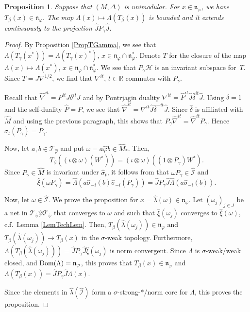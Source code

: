 \documentclass[pdftex]{sigma}
\numberwithin{equation}{section}
\newtheorem{prop}[thm]{Proposition}
\theoremstyle{definition}
\newcommand{\cHil}{\mathcal{H}}
\newcommand{\nphi}{\mathfrak{n}_\varphi}
\newcommand{\Dom}{\text{\rm Dom}}
\begin{document}
\begin{prop}\label{PropTBeta}
Suppose that $(M, \Delta)$ is unimodular. For $x \in \nphi$, we have $T_\beta(x) \in \nphi$. The map $\Lambda(x) \mapsto \Lambda(T_\beta(x))$ is bounded and it extends continuously to the projection $\hat{J} P_\gamma \hat{J}$.
\end{prop}
\begin{proof}
By Proposition \ref{PropTGamma}, we see that $\Lambda(T_\gamma(x^\ast)) = \Lambda(T_\gamma(x)^\ast)$, $x \in \nphi \cap \nphi^\ast$. Denote $T$ for the closure of the map $\Lambda(x) \mapsto \Lambda(x^\ast)$, $x \in \nphi \cap \nphi^\ast$. We see that $P_\gamma \cHil$ is an invariant subspace for~$T$. Since $T = J \nabla^{1/2}$, we f\/ind that $\nabla^{it}$, $t \in \mathbb{R}$ commutes with $P_\gamma$.

Recall \cite[Lemma 8.8, Proposition 8.9]{KusVae} that $\hat{\nabla}^{it} =  P^{it} J \delta^{it} J$ and by Pontrjagin duality  $\nabla^{it} =  \hat{P}^{it} \hat{J} \hat{\delta}^{it} \hat{J}$. Using $\delta = 1$ and the self-duality $\hat{P} = P$, we see that $\hat{\nabla}^{it} =  \nabla^{it} \hat{J} \hat{\delta}^{-it} \hat{J}$. Since $\hat{\delta}$ is af\/f\/iliated with $\hat{M}$ and using the previous paragraph, this shows that $P_\gamma \hat{\nabla}^{it} = \hat{\nabla}^{it} P_\gamma$. Hence $\hat{\sigma}_t (P_\gamma) = P_\gamma$.

Now, let $a, b \in \mathcal{T}_{\hat{\varphi}}$ and put $\omega = a\hat{ \varphi} b \in \hat{M}_\ast$. Then,
\[
T_\beta\left( (\iota \otimes \omega)(W^\ast) \right) = (\iota \otimes \omega)\left( (1 \otimes P_\gamma) W^\ast \right).
\]
Since $P_\gamma \in \hat{M}$ is invariant under $\hat{\sigma}_t$, it follows from \cite[Chapter VIII, Lemma 2.4 (ii) and Lemma 2.5]{TakII} that $\omega P_\gamma \in \hat{\mathcal{I}}$ and
\[
\hat{\xi}(\omega P_\gamma ) = \hat{\Lambda}(a \hat{\sigma}_{-i}(b) \hat{\sigma}_{-i}(P_\gamma))  = \hat{J} P_\gamma \hat{J} \hat{\Lambda}(a \hat{\sigma}_{-i}(b) ).
\]

Now, let $\omega \in \hat{\mathcal{I}}$. We prove the proposition for $x = \hat{\lambda}(\omega) \in \nphi$. Let $(\omega_j)_{j \in J}$ be a net in $\mathcal{T}_{\hat{\varphi}} \hat{\varphi} \mathcal{T}_{\hat{\varphi}}$ that converges to $\omega$ and such that $\hat{\xi}(\omega_j)$ converges to $\hat{\xi}(\omega)$, c.f.\ Lemma \ref{LemTechLem}. Then, $T_\beta(\hat{\lambda}(\omega_j)) \in \nphi$ and  $T_\beta(\hat{\lambda}(\omega_j)) \rightarrow T_\beta(x)$ in the $\sigma$-weak topology. Furthermore, $\Lambda(T_\beta(\hat{\lambda}(\omega_j))) = \hat{J} P_\gamma \hat{J}\hat{\xi}(\omega_j)$ is norm convergent. Since $\Lambda$ is $\sigma$-weak/weak closed, and $\Dom(\Lambda) = \nphi$, this proves that $T_\beta(x) \in \nphi$ and $\Lambda(T_\beta(x)) =   \hat{J} P_\gamma \hat{J} \Lambda(x)$.

 Since the elements in $\hat{\lambda}(\hat{\mathcal{I}})$ form a $\sigma$-strong-$\ast$/norm core for $\Lambda$, this proves the proposition.
\end{proof}
\end{document}
